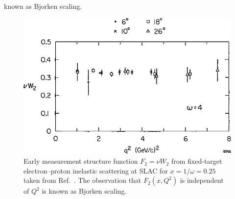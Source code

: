 known as Bjorken scaling\cite{bjorken1969}.
\begin{figure}[htpb!]
	\centering
	\includegraphics[width=0.5\linewidth]{images/nu_W2}
	\caption{Early measurement structure function $F_2=\nu W_2$ from 
	fixed-target electron–proton inelastic scattering at SLAC for 
	$x=1/\omega=0.25$ taken from Ref.\ \cite{friedman1972}. The observation 
	that $F_2(x,Q^2)$ is independent of $Q^2$ is known as Bjorken scaling. }
	\label{fig:w2}
\end{figure}

